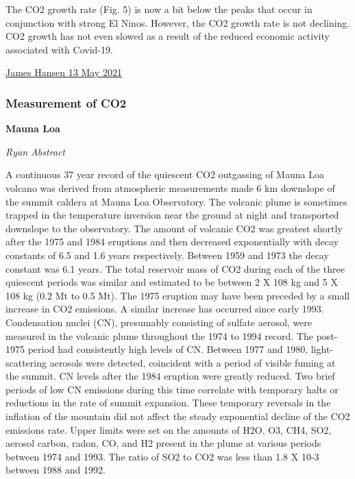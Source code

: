 \documentclass[
]{book}
\begin{document}
The CO2 growth rate (Fig. 5) is now a bit below the peaks that occur in conjunction with strong El Ninos. However, the CO2 growth rate is not declining. CO2 growth has not even slowed as a result of the reduced economic activity associated with Covid-19.

\href{https://mailchi.mp/caa/the-world-has-cooled-off-whats-the-significance}{James Hansen 13 May 2021}

\hypertarget{measurement-of-co2}{%
\subsubsection{Measurement of CO2}\label{measurement-of-co2}}

\textbf{Mauna Loa}

\emph{Ryan Abstract}

A continuous 37 year record of the quiescent CO2 outgassing of Mauna Loa volcano was derived from atmospheric measurements made 6 km downslope of the summit caldera at Mauna Loa Observatory. The volcanic plume is sometimes trapped in the temperature inversion near the ground at night and transported downslope to the observatory. The amount of volcanic CO2 was greatest shortly after the 1975 and 1984 eruptions and then decreased exponentially with decay constants of 6.5 and 1.6 years respectively. Between 1959 and 1973 the decay constant was 6.1 years. The total reservoir mass of CO2 during each of the three quiescent periods was similar and estimated to be between 2 X 108 kg and 5 X 108 kg (0.2 Mt to 0.5 Mt). The 1975 eruption may have been preceded by a small increase in CO2 emissions. A similar increase has occurred since early 1993. Condensation nuclei (CN), presumably consisting of sulfate aerosol, were measured in the volcanic plume throughout the 1974 to 1994 record. The post-1975 period had consistently high levels of CN. Between 1977 and 1980, light-scattering aerosols were detected, coincident with a period of visible fuming at the summit. CN levels after the 1984 eruption were greatly reduced. Two brief periods of low CN emissions during this time correlate with temporary halts or reductions in the rate of summit expansion. These temporary reversals in the inflation of the mountain did not affect the steady exponential decline of the CO2 emissions rate. Upper limits were set on the amounts of H2O, O3, CH4, SO2, aerosol carbon, radon, CO, and H2 present in the plume at various periods between 1974 and 1993. The ratio of SO2 to CO2 was less than 1.8 X 10-3 between 1988 and 1992.
\end{document}
